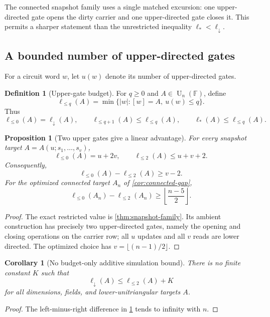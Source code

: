 \documentclass[11pt]{amsart}
\numberwithin{equation}{section}
\newtheorem{proposition}[theorem]{Proposition}
\newtheorem{corollary}[theorem]{Corollary}
\theoremstyle{definition}
\newtheorem{definition}[theorem]{Definition}
\theoremstyle{remark}
\newcommand{\F}{\mathbb F}
\newcommand{\U}{\operatorname{U}}
\newcommand{\ellDown}{\ell_{\downarrow}}
\newcommand{\ellAll}{\ell_{*}}
\newcommand{\ellBudget}[1]{\ell_{\le #1}}
\begin{document}
The connected snapshot family uses a single matched excursion: one upper-directed gate opens the dirty carrier and one upper-directed gate closes it.  This permits a sharper statement than the unrestricted inequality $\ellAll<\ellDown$.

\subsection{A bounded number of upper-directed gates}

For a circuit word $w$, let $u(w)$ denote its number of upper-directed gates.

\begin{definition}[Upper-gate budget]
For $q\ge0$ and $A\in\U_n(\F)$, define
\[
\ellBudget{q}(A)
=
\min\{|w|:[w]=A,\ u(w)\le q\}.
\]
Thus
\[
\ellBudget{0}(A)=\ellDown(A),
\qquad
\ellBudget{q+1}(A)\le\ellBudget{q}(A),
\qquad
\ellAll(A)\le\ellBudget{q}(A).
\]
\end{definition}

\begin{proposition}[Two upper gates give a linear advantage]\label{prop:two-upper-linear}
For every snapshot target $A=A(u;s_1,\ldots,s_v)$,
\[
\ellBudget{0}(A)=u+2v,
\qquad
\ellBudget{2}(A)\le u+v+2.
\]
Consequently,
\[
\ellBudget{0}(A)-\ellBudget{2}(A)\ge v-2.
\]
For the optimized connected target $A_n$ of \cref{cor:connected-gap},
\[
\ellBudget{0}(A_n)-\ellBudget{2}(A_n)
\ge
\left\lfloor\frac{n-5}{2}\right\rfloor.
\]
\end{proposition}

\begin{proof}
The exact restricted value is \cref{thm:snapshot-family}.  Its ambient construction has precisely two upper-directed gates, namely the opening and closing operations on the carrier row; all $u$ updates and all $v$ reads are lower directed.  The optimized choice has $v=\lfloor(n-1)/2\rfloor$.
\end{proof}

\begin{corollary}[No budget-only additive simulation bound]\label{cor:no-budget-only}
There is no finite constant $K$ such that
\[
\ellDown(A)\le\ellBudget{2}(A)+K
\]
for all dimensions, fields, and lower-unitriangular targets $A$.
\end{corollary}

\begin{proof}
The left-minus-right difference in \cref{prop:two-upper-linear} tends to infinity with $n$.
\end{proof}
\end{document}
